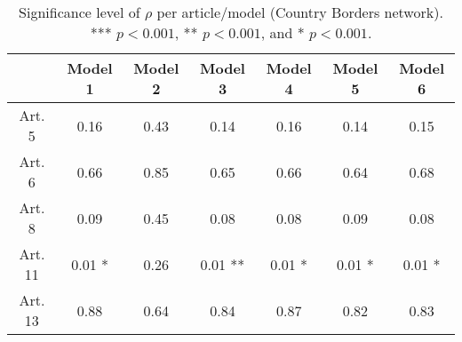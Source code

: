 \begin{table}[ht]
\centering
\begin{tabular}{ccccccc}
  \toprule
 & Model 1 & Model 2 & Model 3 & Model 4 & Model 5 & Model 6 \\ 
  \midrule
Art. 5 & 0.16   & 0.43   & 0.14   & 0.16   & 0.14   & 0.15   \\ 
   \midrule
Art. 6 & 0.66   & 0.85   & 0.65   & 0.66   & 0.64   & 0.68   \\ 
   \midrule
Art. 8 & 0.09   & 0.45   & 0.08   & 0.08   & 0.09   & 0.08   \\ 
   \midrule
Art. 11 & 0.01 * & 0.26   & 0.01 ** & 0.01 * & 0.01 * & 0.01 * \\ 
   \midrule
Art. 13 & 0.88   & 0.64   & 0.84   & 0.87   & 0.82   & 0.83   \\ 
   \bottomrule
\end{tabular}
\caption{Significance level of $\rho$ per article/model (Country Borders network). *** $p < 0.001$, ** $p < 0.001$, and * $p < 0.001$.} 
\end{table}
